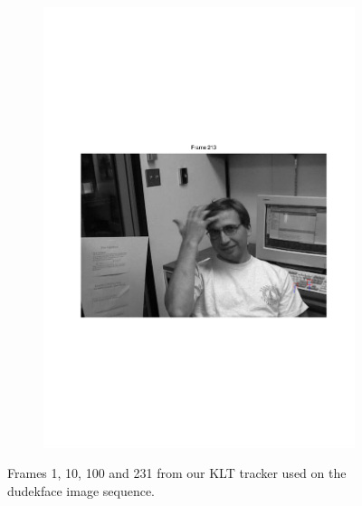 \documentclass[11pt,a4paper]{article}
\begin{document}
\begin{figure}[H]
\begin{subfigure}{0.45\textwidth}
\includegraphics[scale=0.4,trim={70 250 90 250}]{img/tracker_dudekface_213.pdf}
\end{subfigure}
\caption{Frames 1, 10, 100 and 231 from our KLT tracker used on the dudekface image sequence.}
\label{fig:tracker_dudekface}
\end{figure}
\end{document}
